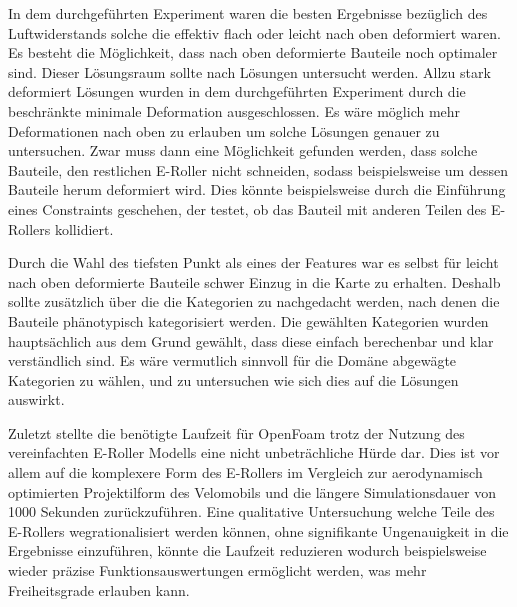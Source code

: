 In dem durchgeführten Experiment waren die besten Ergebnisse bezüglich des Luftwiderstands solche die effektiv flach oder leicht nach oben deformiert waren.
Es besteht die Möglichkeit, dass nach oben deformierte Bauteile noch optimaler sind.
Dieser Lösungsraum sollte nach Lösungen untersucht werden.
Allzu stark deformiert Lösungen wurden in  dem durchgeführten Experiment durch die beschränkte minimale Deformation ausgeschlossen.
Es wäre möglich mehr Deformationen nach oben zu erlauben um solche Lösungen genauer zu untersuchen.
Zwar muss dann eine Möglichkeit gefunden werden, dass solche Bauteile, den restlichen E-Roller nicht schneiden, sodass beispielsweise um dessen Bauteile herum deformiert wird.
Dies könnte beispielsweise durch die Einführung eines Constraints geschehen, der testet, ob das Bauteil mit anderen Teilen des E-Rollers kollidiert.

Durch die Wahl des tiefsten Punkt als eines der Features war es selbst für leicht nach oben deformierte Bauteile schwer Einzug in die Karte zu erhalten.
Deshalb sollte zusätzlich über die die Kategorien zu nachgedacht werden, nach denen die Bauteile phänotypisch kategorisiert werden.
Die gewählten Kategorien wurden hauptsächlich aus dem Grund gewählt, dass diese einfach berechenbar und klar verständlich sind.
Es wäre vermutlich sinnvoll für die Domäne abgewägte Kategorien zu wählen, und zu untersuchen wie sich dies auf die Lösungen auswirkt.

Zuletzt stellte die benötigte Laufzeit für OpenFoam trotz der Nutzung des vereinfachten E-Roller Modells eine nicht unbeträchliche Hürde dar.
Dies ist vor allem auf die komplexere Form des E-Rollers im Vergleich zur aerodynamisch optimierten Projektilform des Velomobils und die längere Simulationsdauer von 1000 Sekunden zurückzuführen.
Eine qualitative Untersuchung welche Teile des E-Rollers wegrationalisiert werden können, ohne signifikante Ungenauigkeit in die Ergebnisse einzuführen, könnte die Laufzeit reduzieren wodurch beispielsweise wieder präzise Funktionsauswertungen ermöglicht werden, was mehr Freiheitsgrade erlauben kann.